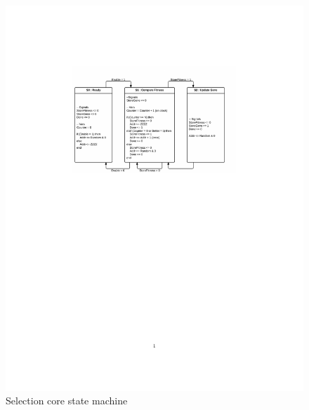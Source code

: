 \begin{figure}

  \centering
  \includegraphics[trim=5cm 16cm 1cm 5cm, clip=true ]{fpga/fig/selection_core_state_machine.pdf}
  \caption{Selection core state machine}
  \label{fpga:fig:selection:selection_core_state_machine}
\end{figure}
